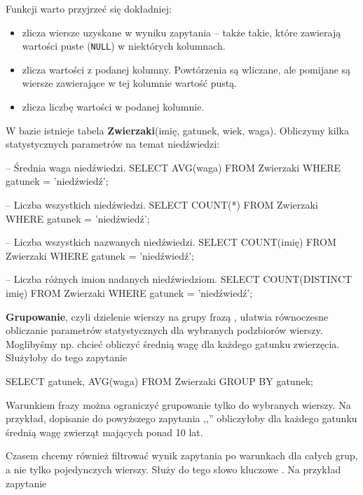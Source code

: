 Funkcji  warto przyjrzeć się dokładniej:
\begin{itemize}
	\item {} zlicza wiersze uzyskane w wyniku zapytania -- także takie, które zawierają wartości puste (\texttt{NULL}) w niektórych kolumnach.
	\item {} zlicza wartości z podanej kolumny. Powtórzenia są wliczane, ale pomijane są wiersze zawierające w tej kolumnie wartość pustą.
	\item {} zlicza liczbę  wartości w podanej kolumnie.
\end{itemize}

\begin{example}
	W bazie istnieje tabela \textbf{Zwierzaki}(imię, gatunek, wiek, waga). Obliczymy kilka statystycznych parametrów na temat niedźwiedzi:
	
	\begin{sql}
		-- Średnia waga niedźwiedzi.
		SELECT AVG(waga)
		FROM Zwierzaki
		WHERE gatunek = 'niedźwiedź';
		
		-- Liczba wszystkich niedźwiedzi.
		SELECT COUNT(*)
		FROM Zwierzaki
		WHERE gatunek = 'niedźwiedź';
		
		-- Liczba wszystkich nazwanych niedźwiedzi.
		SELECT COUNT(imię)
		FROM Zwierzaki
		WHERE gatunek = 'niedźwiedź';
		
		-- Liczba różnych imion nadanych niedźwiedziom.
		SELECT COUNT(DISTINCT imię)
		FROM Zwierzaki
		WHERE gatunek = 'niedźwiedź';
	\end{sql}
\end{example}

\textbf{Grupowanie}, czyli dzielenie wierszy na grupy frazą , ułatwia równoczesne obliczanie parametrów statystycznych dla wybranych podzbiorów wierszy. Moglibyśmy np. chcieć obliczyć średnią wagę dla każdego gatunku zwierzęcia. Służyłoby do tego zapytanie
\begin{sql}
	SELECT gatunek, AVG(waga)
	FROM Zwierzaki
	GROUP BY gatunek;
\end{sql}

Warunkiem frazy  można ograniczyć grupowanie tylko do wybranych wierszy. Na przykład, dopisanie do powyższego zapytania ,,'' obliczyłoby dla każdego gatunku średnią wagę zwierząt mających ponad 10 lat.

Czasem chcemy również filtrować wynik zapytania po warunkach dla całych grup, a nie tylko pojedynczych wierszy. Służy do tego słowo kluczowe . Na przykład zapytanie

